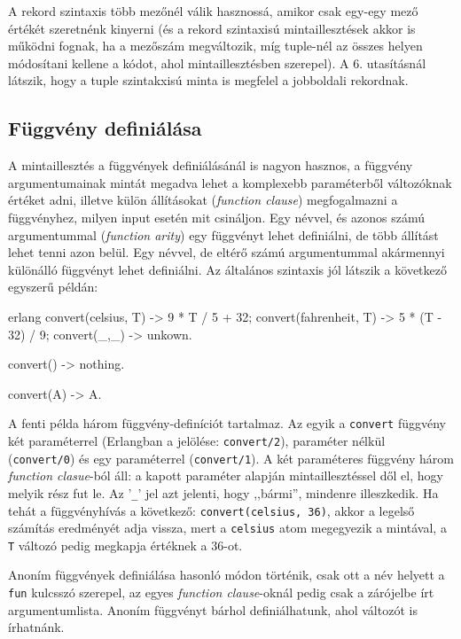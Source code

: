 \documentclass[12pt, a4paper, oneside]{book}
\begin{document}
\noindent A rekord szintaxis több mezőnél válik hasznossá, amikor csak egy-egy
mező értékét szeretnénk kinyerni (és a rekord szintaxisú mintaillesztések akkor
is működni fognak, ha a mezőszám megváltozik, míg tuple-nél az összes helyen
módosítani kellene a kódot, ahol mintaillesztésben szerepel). A 6. utasításnál
látszik, hogy a tuple szintakxisú minta is megfelel a jobboldali rekordnak.

\subsection{Függvény definiálása} A mintaillesztés a függvények definiálásánál
is nagyon hasznos, a függvény argumentumainak mintát megadva lehet a komplexebb
paraméterből változóknak értéket adni, illetve külön állításokat
(\emph{function clause}) megfogalmazni a függvényhez, milyen input esetén mit
csináljon. Egy névvel, és azonos számú argumentummal (\emph{function arity})
egy függvényt lehet definiálni, de több állítást lehet tenni azon belül. Egy
névvel, de eltérő számú argumentummal akármennyi különálló függvényt lehet
definiálni. Az általános szintaxis jól látszik a következő egyszerű példán:

\begin{code}{erlang}{}
convert(celsius, T) ->
  9 * T / 5 + 32;
convert(fahrenheit, T) ->
  5 * (T - 32) / 9;
convert(_,_) ->
  unkown.

convert() ->
  nothing.

convert(A) ->
  A.
\end{code}

A fenti példa három függvény-definíciót tartalmaz. Az egyik a \texttt{convert}
függvény két paraméterrel (Erlangban a jelölése: \texttt{convert/2}), paraméter
nélkül (\texttt{convert/0}) és egy paraméterrel (\texttt{convert/1}). A két
paraméteres függvény három \emph{function clasue}-ból áll: a kapott paraméter
alapján mintaillesztéssel dől el, hogy melyik rész fut le. Az '\texttt{\_}' jel
azt jelenti, hogy ,,bármi'', mindenre illeszkedik. Ha tehát a függvényhívás a
következő: \texttt{convert(celsius, 36)}, akkor a legelső számítás eredményét
adja vissza, mert a \texttt{celsius} atom megegyezik a mintával, a \texttt{T}
változó pedig megkapja értéknek a 36-ot.

Anoním függvények definiálása hasonló módon történik, csak ott a név helyett a
\texttt{fun} kulcsszó szerepel, az egyes \emph{function clause}-oknál pedig
csak a zárójelbe írt argumentumlista. Anoním függvényt bárhol definiálhatunk,
ahol változót is írhatnánk.
\end{document}
